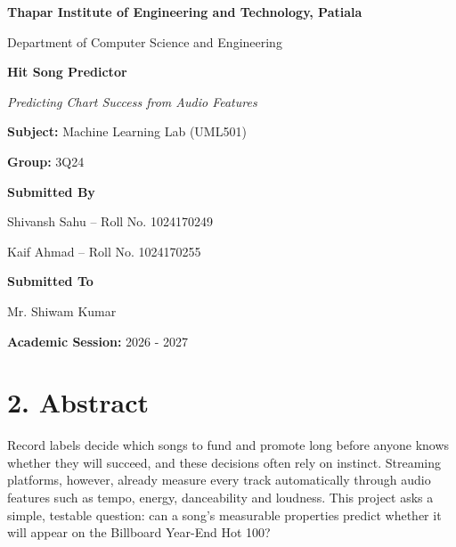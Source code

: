 \documentclass[11pt,a4paper]{article}
\begin{document}
\begin{titlepage}
\centering
\vspace*{1.5cm}

{\large\bfseries Thapar Institute of Engineering and Technology, Patiala\par}
{\large Department of Computer Science and Engineering\par}

\vspace{2.2cm}
{\Huge\bfseries Hit Song Predictor\par}
\vspace{0.3cm}
{\large\itshape Predicting Chart Success from Audio Features\par}

\vspace{1.8cm}
{\large\textbf{Subject:} Machine Learning Lab (UML501)\par}
\vspace{0.2cm}
{\large\textbf{Group:} 3Q24\par}

\vspace{1.4cm}
{\large\textbf{Submitted By}\par}
\vspace{0.2cm}
{\large Shivansh Sahu -- Roll No. 1024170249\par}
{\large Kaif Ahmad -- Roll No. 1024170255\par}

\vspace{1.4cm}
{\large\textbf{Submitted To}\par}
\vspace{0.2cm}
{\large Mr. Shiwam Kumar\par}

\vspace{1.4cm}
{\large\textbf{Academic Session:} 2026 - 2027\par}

\vfill
\end{titlepage}

\section*{2. Abstract}
Record labels decide which songs to fund and promote long before anyone knows whether they will succeed, and these decisions often rely on instinct. Streaming platforms, however, already measure every track automatically through audio features such as tempo, energy, danceability and loudness. This project asks a simple, testable question: can a song's measurable properties predict whether it will appear on the Billboard Year-End Hot 100?
\end{document}
